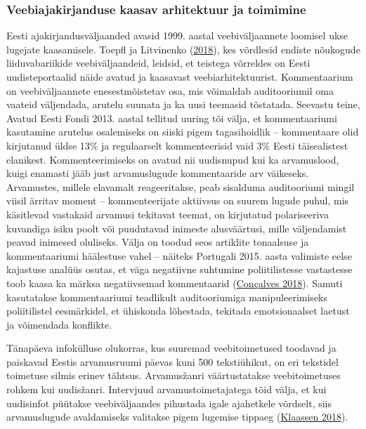 \documentclass[estonian,]{article}
\begin{document}
\hypertarget{veebiajakirjanduse-kaasav-arhitektuur-ja-toimimine}{%
\subsubsection*{Veebiajakirjanduse kaasav arhitektuur ja toimimine}\label{veebiajakirjanduse-kaasav-arhitektuur-ja-toimimine}}

Eesti ajakirjandusväljaanded avasid 1999. aastal veebiväljaannete loomisel ukse lugejate kaasamisele. Toepfl ja Litvinenko (\protect\hyperlink{Toepfl2018}{2018}), kes võrdlesid endiste nõukogude liiduvabariikide veebiväljaandeid, leidsid, et teistega võrreldes on Eesti uudisteportaalid näide avatud ja kaasavast veebiarhitektuurist. Kommentaarium on veebiväljaannete enesestmõistetav osa, mis võimaldab auditooriumil oma vaateid väljendada, arutelu suunata ja ka uusi teemasid tõstatada. Seevastu teine, Avatud Eesti Fondi 2013. aastal tellitud uuring tõi välja, et kommentaariumi kasutamine arutelus osalemiseks on siiski pigem tagasihoidlik -- kommentaare olid kirjutanud üldse 13\% ja regulaarselt kommenteerisid vaid 3\% Eesti täisealistest elanikest. Kommenteerimiseks on avatud nii uudisnupud kui ka arvamuslood, kuigi enamasti jääb just arvamuslugude kommentaaride arv väikeseks. Arvamustes, millele elavamalt reageeritakse, peab sisalduma auditooriumi mingil viisil ärritav moment -- kommenteerijate aktiivsus on suurem lugude puhul, mis käsitlevad vastakaid arvamusi tekitavat teemat, on kirjutatud polariseeriva kuvandiga isiku poolt või puudutavad inimeste alusväärtusi, mille väljendamist peavad inimesed oluliseks. Välja on toodud seos artiklite tonaalsuse ja kommentaariumi häälestuse vahel -- näiteks Portugali 2015. aasta valimiste eelse kajastuse analüüs osutas, et väga negatiivne suhtumine poliitilistesse vastastesse toob kaasa ka märksa negatiivsemad kommentaarid (\protect\hyperlink{Conuxe7alves2018}{Conçalves 2018}). Samuti kasutatakse kommentaariumi teadlikult auditooriumiga manipuleerimiseks poliitilistel eesmärkidel, et ühiskonda lõhestada, tekitada emotsionaalset laetust ja võimendada konflikte.

Tänapäeva infokülluse olukorras, kus suuremad veebitoimetused toodavad ja paiskavad Eestis arvamusruumi päevas kuni 500 tekstiühikut, on eri tekstidel toimetuse silmis erinev tähtsus. Arvamusžanri väärtustatakse veebitoimetuses rohkem kui uudisžanri. Intervjuud arvamustoimetajatega tõid välja, et kui uudisinfot püütakse veebiväljaandes pihustada igale ajahetkele võrdselt, siis arvamuslugude avaldamiseks valitakse pigem lugemise tippaeg (\protect\hyperlink{Klaassen2018}{Klaassen 2018}).
\end{document}
